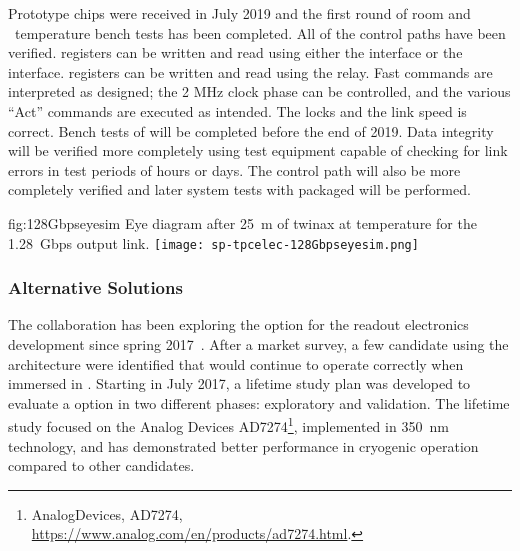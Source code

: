Prototype  chips were received in July 2019 and the first 
round of room and \lntwo\  temperature bench tests has been completed.  
All of the  control paths have been verified.  
registers can be written and read using either the  interface 
or the  interface.  registers can be written and 
read using the  relay. Fast commands are interpreted as designed; 
the 2 MHz clock phase can be controlled, and the various ``Act'' commands 
are executed as intended.  The  locks and the link speed is 
correct. Bench tests of  will be completed before the end
of 2019. Data integrity will be verified more completely using test equipment 
capable of checking for link errors in test periods of hours or days.  
The  control path will also be more completely verified and
later system tests with packaged  will be performed.

\begin{dunefigure}
{fig:128Gbpseyesim}
{Eye diagram after \SI{25}{m} of  twinax at \lntwo
temperature for the  \SI{1.28}{Gbps} output link.}  
\texttt{[image: sp-tpcelec-128Gbpseyesim.png]}
\end{dunefigure}


\subsubsection{Alternative  Solutions}
\label{sec:fdsp-tpcelec-design-asic-alternatives}

\label{sec:fdsp-tpcelec-design-femb-alt-cots}

The  collaboration has been exploring the   option 
for the  readout electronics development since spring
2017~\cite{Chen:2018zic}. After a market survey, a few candidate  
using the  architecture were identified that would continue
to operate correctly when immersed in \lntwo. Starting in
July 2017, a lifetime study plan was developed to evaluate a  
 option in two different phases: exploratory and validation. The 
lifetime study focused on the Analog Devices AD7274\footnote{AnalogDevices,
  AD7274\texttrademark{}, \url{https://www.analog.com/en/products/ad7274.html}.},
implemented in  \SI{350}{nm}  technology, and has
demonstrated better performance in cryogenic operation compared to other candidates.

